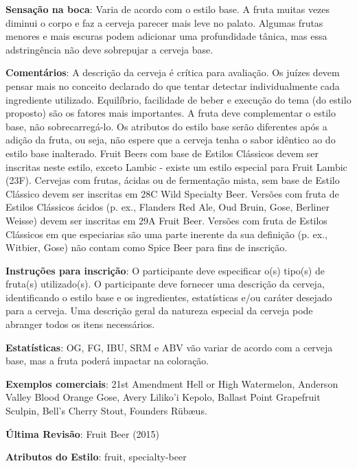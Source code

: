 \textbf{Sensação na boca}: Varia de acordo com o estilo base. A fruta muitas vezes diminui o corpo e faz a cerveja parecer mais leve no palato. Algumas frutas menores e mais escuras podem adicionar uma profundidade tânica, mas essa adstringência não deve sobrepujar a cerveja base.

\textbf{Comentários}: A descrição da cerveja é crítica para avaliação. Os juízes devem pensar mais no conceito declarado do que tentar detectar individualmente cada ingrediente utilizado. Equilíbrio, facilidade de beber e execução do tema (do estilo proposto) são os fatores mais importantes. A fruta deve complementar o estilo base, não sobrecarregá-lo. Os atributos do estilo base serão diferentes após a adição da fruta, ou seja, não espere que a cerveja tenha o sabor idêntico ao do estilo base inalterado. Fruit Beers com base de Estilos Clássicos devem ser inscritas neste estilo, exceto Lambic - existe um estilo especial para Fruit Lambic (23F). Cervejas com frutas, ácidas ou de fermentação mista, sem base de Estilo Clássico devem ser inscritas em 28C Wild Specialty Beer. Versões com fruta de Estilos Clássicos ácidos (p. ex., Flanders Red Ale, Oud Bruin, Gose, Berliner Weisse) devem ser inscritas em 29A Fruit Beer. Versões com fruta de Estilos Clássicos em que especiarias são uma parte inerente da sua definição (p. ex., Witbier, Gose) não contam como Spice Beer para fins de inscrição.

\textbf{Instruções para inscrição}: O participante deve especificar o(s) tipo(s) de fruta(s) utilizado(s). O participante deve fornecer uma descrição da cerveja, identificando o estilo base e os ingredientes, estatísticas e/ou caráter desejado para a cerveja. Uma descrição geral da natureza especial da cerveja pode abranger todos os itens necessários.

\textbf{Estatísticas}: OG, FG, IBU, SRM e ABV vão variar de acordo com a cerveja base, mas a fruta poderá impactar na coloração.

\textbf{Exemplos comerciais}: 21st Amendment Hell or High Watermelon, Anderson Valley Blood Orange Gose, Avery Liliko'i Kepolo, Ballast Point Grapefruit Sculpin, Bell's Cherry Stout, Founders Rübæus.

\textbf{Última Revisão}: Fruit Beer (2015)

\textbf{Atributos do Estilo}: fruit, specialty-beer
